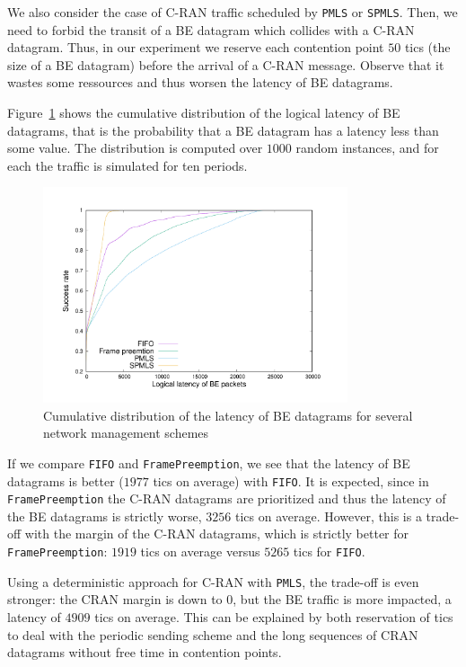 \documentclass[a4paper,10pt]{article}
\newcommand\PMLS{\texttt{PMLS}\xspace}
\newcommand\SPMLS{\texttt{SPMLS}\xspace}
\newcommand\FIFO{\texttt{FIFO}\xspace}
\newcommand\framepre{\texttt{FramePreemption}\xspace}
\begin{document}
    We also consider the case of C-RAN traffic scheduled by \PMLS or \SPMLS. Then, we need to forbid the transit of a BE datagram which collides with a C-RAN datagram. Thus, in our experiment we reserve each contention point $50$ tics (the size of a BE datagram) before the arrival of a C-RAN message. Observe that
    it wastes some ressources and thus worsen the latency of BE datagrams.
    
    Figure~\ref{fig:belatency} shows the cumulative distribution of the logical latency of BE datagrams, that is the probability that a BE datagram has a latency less than some value.
    The distribution is computed over $1000$ random instances, and for each the traffic is simulated for ten periods.

     \begin{figure}
       \begin{center}
      \includegraphics[width = 0.8\textwidth]{res.pdf}
      \end{center}
      \caption{Cumulative distribution of the latency of BE datagrams for several network management schemes}
      \label{fig:belatency}   
     \end{figure}    
     

     If we compare \FIFO and \framepre, we see that the latency of BE datagrams is better ($1977$ tics on average) with \FIFO. It is expected, since in \framepre the C-RAN datagrams are prioritized and thus 
     the latency of the BE datagrams is strictly worse, $3256$ tics on average. However, this is a trade-off with the margin of the C-RAN datagrams, which is strictly better for \framepre: $1919$ tics on average versus $5265$ tics for \FIFO. 

     Using a deterministic approach for C-RAN with \PMLS, the trade-off is even stronger:
      the CRAN margin is down to $0$, but the BE traffic is more impacted, a latency of $4909$ tics on average. This can be explained by both reservation of tics to deal with the periodic sending scheme and the long sequences of CRAN datagrams without free time in contention points.
     
\end{document}
